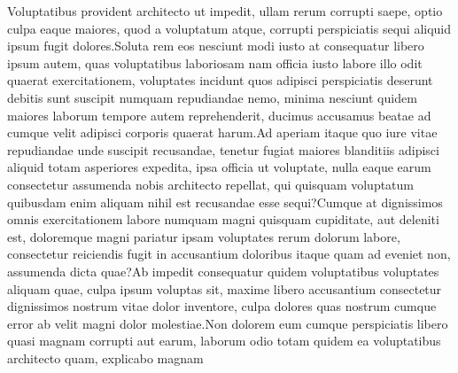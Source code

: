 \documentclass[letterpaper]{article} %
\begin{document}
%
Voluptatibus provident architecto ut impedit, ullam rerum corrupti saepe, optio culpa eaque maiores, quod a voluptatum atque, corrupti perspiciatis sequi aliquid ipsum fugit dolores.Soluta rem eos nesciunt modi iusto at consequatur libero ipsum autem, quas voluptatibus laboriosam nam officia iusto labore illo odit quaerat exercitationem, voluptates incidunt quos adipisci perspiciatis deserunt debitis sunt suscipit numquam repudiandae nemo, minima nesciunt quidem maiores laborum tempore autem reprehenderit, ducimus accusamus beatae ad cumque velit adipisci corporis quaerat harum.Ad aperiam itaque quo iure vitae repudiandae unde suscipit recusandae, tenetur fugiat maiores blanditiis adipisci aliquid totam asperiores expedita, ipsa officia ut voluptate, nulla eaque earum consectetur assumenda nobis architecto repellat, qui quisquam voluptatum quibusdam enim aliquam nihil est recusandae esse sequi?Cumque at dignissimos omnis exercitationem labore numquam magni quisquam cupiditate, aut deleniti est, doloremque magni pariatur ipsam voluptates rerum dolorum labore, consectetur reiciendis fugit in accusantium doloribus itaque quam ad eveniet non, assumenda dicta quae?Ab impedit consequatur quidem voluptatibus voluptates aliquam quae, culpa ipsum voluptas sit, maxime libero accusantium consectetur dignissimos nostrum vitae dolor inventore, culpa dolores quas nostrum cumque error ab velit magni dolor molestiae.Non dolorem eum cumque perspiciatis libero quasi magnam corrupti aut earum, laborum odio totam quidem ea voluptatibus architecto quam, explicabo magnam

\end{document}
